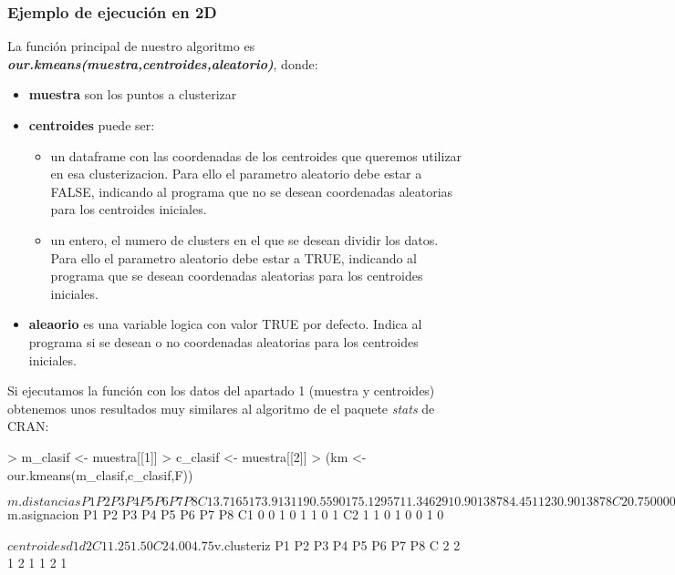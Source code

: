\documentclass [a4paper] {article}
\begin{document}
\subsubsection{Ejemplo de ejecución en 2D}
La función principal de nuestro algoritmo es \textbf{\textit{our.kmeans(muestra,centroides,aleatorio)}}, donde:
\begin{itemize}
\item \textbf{muestra} son los puntos a clusterizar
\item \textbf{centroides} puede ser:
	\begin{itemize}
	\item un dataframe con las coordenadas de los centroides que queremos utilizar en esa clusterizacion. Para ello el parametro aleatorio debe estar a FALSE, indicando al programa que no se desean coordenadas aleatorias para los centroides iniciales.
	\item un entero, el numero de clusters en el que se desean dividir los datos. Para ello el parametro aleatorio debe estar a TRUE, indicando al programa que se desean coordenadas aleatorias para los centroides iniciales.
	\end{itemize}
\item \textbf{aleaorio} es una variable logica con valor TRUE por defecto. Indica al programa si se desean o no coordenadas aleatorias para los centroides iniciales.
\end{itemize}

Si ejecutamos la función con los datos del apartado 1 (muestra y centroides) obtenemos unos resultados muy similares al algoritmo de el paquete \textit{stats} de CRAN:
\begin{Schunk}
\begin{Sinput}
> m_clasif <- muestra[[1]]
> c_clasif <- muestra[[2]]
> (km <- our.kmeans(m_clasif,c_clasif,F))
\end{Sinput}
\begin{Soutput}
$m.distancias
         P1       P2       P3       P4       P5        P6       P7        P8
C1 3.716517 3.913119 0.559017 5.129571 1.346291 0.9013878 4.451123 0.9013878
C2 0.750000 1.030776 4.069705 1.030776 5.482928 3.4003676 0.250000 4.2500000

$m.asignacion
   P1 P2 P3 P4 P5 P6 P7 P8
C1  0  0  1  0  1  1  0  1
C2  1  1  0  1  0  0  1  0

$centroides
     d1   d2
C1 1.25 1.50
C2 4.00 4.75

$v.clusteriz
  P1 P2 P3 P4 P5 P6 P7 P8
C  2  2  1  2  1  1  2  1
\end{Soutput}
\end{Schunk}
\end{document}
